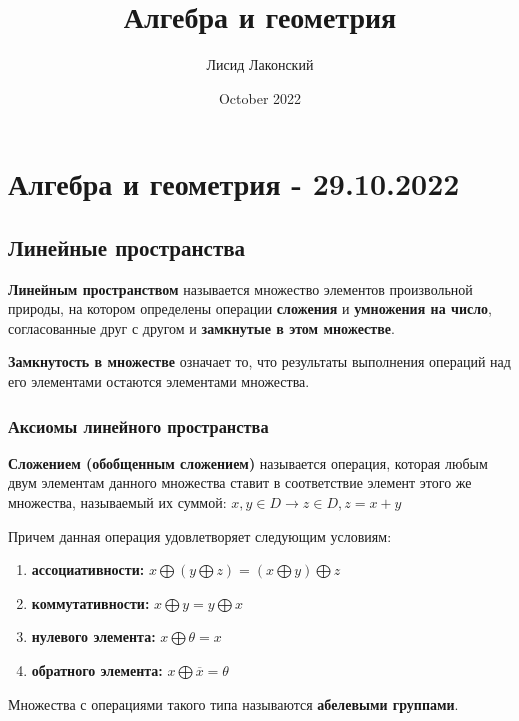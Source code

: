 \documentclass{article}
\title{Алгебра и геометрия}
\author{Лисид Лаконский}
\date{October 2022}
\begin{document}
\maketitle

\tableofcontents
\pagebreak

\section{Алгебра и геометрия - 29.10.2022}

\subsection{Линейные пространства}

\begin{flushleft}

\textbf{Линейным пространством} называется множество элементов произвольной природы, на котором определены операции \textbf{сложения} и \textbf{умножения на число}, согласованные друг с другом и \textbf{замкнутые в этом множестве}.

\hfill

\textbf{Замкнутость в множестве} означает то, что результаты выполнения операций над его элементами остаются элементами множества.

\subsubsection{Аксиомы линейного пространства}

\textbf{Сложением (обобщенным сложением)} называется операция, которая любым двум элементам данного множества ставит в соответствие элемент этого же множества, называемый их суммой: $x, y \in D \rightarrow z \in D, z = x + y$

Причем данная операция удовлетворяет следующим условиям:

\begin{enumerate}
    \item \textbf{ассоциативности:} $x \bigoplus (y \bigoplus z) = (x \bigoplus y) \bigoplus z$
    \item \textbf{коммутативности:} $x \bigoplus y = y \bigoplus x$
    \item \textbf{нулевого элемента:} $x \bigoplus \theta = x$
    \item \textbf{обратного элемента:} $x \bigoplus \overline{x} = \theta$
\end{enumerate}

Множества с операциями такого типа называются \textbf{абелевыми группами}.


\end{flushleft}
\end{document}
